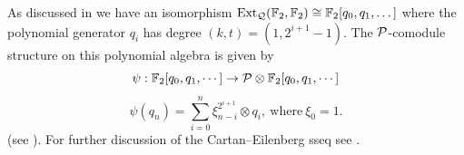 As discussed in  we have an isomorphism
$\Ext_{\mathcal{Q}}(\F_2,\F_2) \cong \F_2[q_0,q_1,\dots]$
where the polynomial generator $q_i$ has degree $(k,t) = (1,2^{i+1}-1)$.
The $\P$-comodule structure on this polynomial algebra is given by 
\begin{equation}
\psi: \F_2[q_0, q_1, \cdots] \to \P \otimes \F_2[q_0, q_1, \cdots] 
\end{equation}
$$ \psi(q_n) = \sum_{i=0}^n \xi_{n-i}^{2^{i+1}} \otimes q_{i}, \ \text{where} \ \xi_0 = 1.$$
(see \cite[Theorem~4.3.3]{RavenelGreenBook}).
For further discussion of the Cartan--Eilenberg sseq see \cite{AndrewsMiller, MillerSquare, RavenelGreenBook}.





 
